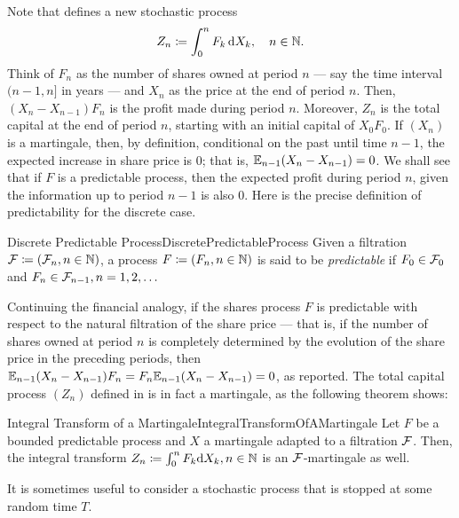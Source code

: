 Note that  defines a new stochastic process
\begin{equation}\label{eq:DiscreteProcessZ}
	Z_n \coloneqq \int_0^n F_k \, \mathrm{d} X_k, \quad n \in \mathbb{N}.
\end{equation}
Think of $F_n$ as the number of shares owned at period $n$ — say the time interval $(n-1, n]$ in years — and $X_n$ as the price at the end of period $n$. Then, $(X_n - X_{n-1}) F_n$ is the profit made during period $n$. Moreover, $Z_n$ is the total capital at the end of period $n$, starting with an initial capital of $X_0 F_0$. If $(X_n)$ is a martingale, then, by definition, conditional on the past until time $n-1$, the expected increase in share price is 0; that is, $\mathbb{E}_{n-1}(X_n - X_{n-1}) = 0$. We shall see that if $F$ is a predictable process, then the expected profit during period $n$, given the information up to period $n-1$ is also 0. Here is the precise definition of predictability for the discrete case.


\begin{defn}{Discrete Predictable Process}{DiscretePredictableProcess}
	Given a filtration $\mathcal{F} \coloneqq (\mathcal{F}_n, n \in \mathbb{N})$, a process $F \coloneqq (F_n, n \in \mathbb{N})$ is said to be \emph{predictable} if $F_0 \in \mathcal{F}_0$ and $F_n \in \mathcal{F}_{n-1}, n = 1, 2, \dots$
\end{defn}

Continuing the financial analogy, if the shares process $F$ is predictable with respect to the natural filtration of the share price — that is, if the number of shares owned at period $n$ is completely determined by the evolution of the share price in the preceding periods, then $\mathbb{E}_{n-1}(X_n - X_{n-1})F_n = F_n \mathbb{E}_{n-1}(X_n - X_{n-1}) = 0$, as reported. The total capital process $(Z_n)$ defined in  is in fact a martingale, as the following theorem shows:

\begin{thm}{Integral Transform of a Martingale}{IntegralTransformOfAMartingale}
	Let $F$ be a bounded predictable process and $X$ a martingale adapted to a filtration $\mathcal{F}$. Then, the integral transform $Z_n \coloneqq \int_0^n F_k \mathrm{d} X_k, n \in \mathbb{N}$ is an $\mathcal{F}$-martingale as well.
\end{thm}

It is sometimes useful to consider a stochastic process that is stopped at some random time \(T\).

